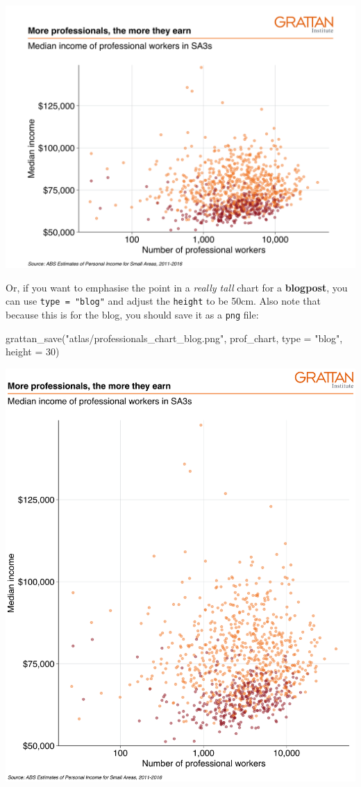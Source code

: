 \documentclass[
]{book}
\newenvironment{Shaded}{\begin{snugshade}}{\end{snugshade}}
\newcommand{\AttributeTok}[1]{\textcolor[rgb]{0.77,0.63,0.00}{#1}}
\newcommand{\DecValTok}[1]{\textcolor[rgb]{0.00,0.00,0.81}{#1}}
\newcommand{\FunctionTok}[1]{\textcolor[rgb]{0.00,0.00,0.00}{#1}}
\newcommand{\NormalTok}[1]{#1}
\newcommand{\StringTok}[1]{\textcolor[rgb]{0.31,0.60,0.02}{#1}}
\begin{document}
\includegraphics[width=44.44in]{atlas/professionals_chart_presentation}

Or, if you want to emphasise the point in a \emph{really tall} chart for a \textbf{blogpost}, you can use \texttt{type\ =\ "blog"} and adjust the \texttt{height} to be 50cm. Also note that because this is for the blog, you should save it as a \texttt{png} file:

\begin{Shaded}
\begin{Highlighting}[]
\FunctionTok{grattan\_save}\NormalTok{(}\StringTok{"atlas/professionals\_chart\_blog.png"}\NormalTok{, prof\_chart, }
             \AttributeTok{type =} \StringTok{"blog"}\NormalTok{, }\AttributeTok{height =} \DecValTok{30}\NormalTok{)}
\end{Highlighting}
\end{Shaded}

\includegraphics[width=44.44in]{atlas/professionals_chart_blog}
\end{document}
